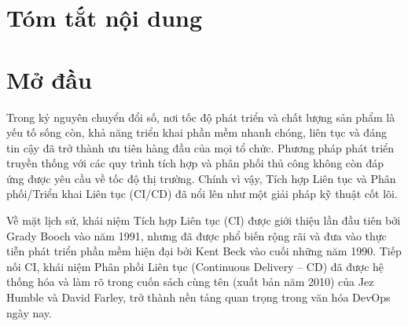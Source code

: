 \chapter*{Tóm tắt nội dung}
%

\chapter*{Mở đầu}

Trong kỷ nguyên chuyển đổi số, nơi tốc độ phát triển và chất lượng sản phẩm là yếu tố sống còn, khả năng triển khai phần mềm nhanh chóng, liên tục và đáng tin cậy đã trở thành ưu tiên hàng đầu của mọi tổ chức. Phương pháp phát triển truyền thống với các quy trình tích hợp và phân phối thủ công không còn đáp ứng được yêu cầu về tốc độ thị trường. Chính vì vậy, Tích hợp Liên tục và Phân phối/Triển khai Liên tục (CI/CD) đã nổi lên như một giải pháp kỹ thuật cốt lõi.

Về mặt lịch sử, khái niệm Tích hợp Liên tục (CI) được giới thiệu lần đầu tiên bởi Grady Booch vào năm 1991, nhưng đã được phổ biến rộng rãi và đưa vào thực tiễn phát triển phần mềm hiện đại bởi Kent Beck vào cuối những năm 1990. Tiếp nối CI, khái niệm Phân phối Liên tục (Continuous Delivery – CD) đã được hệ thống hóa và làm rõ trong cuốn sách cùng tên (xuất bản năm 2010) của Jez Humble và David Farley, trở thành nền tảng quan trọng trong văn hóa DevOps ngày nay.

